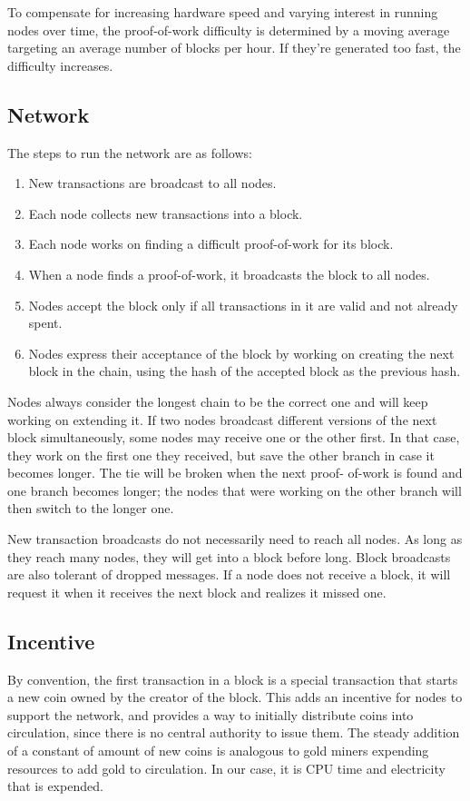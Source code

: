\documentclass[11pt]{article}
\begin{document}
To compensate for increasing hardware speed and varying interest in running nodes over time, the proof-of-work difficulty is determined by a moving average targeting an average number of blocks per hour.
If they're generated too fast, the difficulty increases.

\subsection{Network}
\label{sec:orga9cfa59}
The steps to run the network are as follows:

\begin{enumerate}
\item New transactions are broadcast to all nodes.
\item Each node collects new transactions into a block.
\item Each node works on finding a difficult proof-of-work for its block.
\item When a node finds a proof-of-work, it broadcasts the block to all nodes.
\item Nodes accept the block only if all transactions in it are valid and not already spent.
\item Nodes express their acceptance of the block by working on creating the next block in the chain, using the hash of the accepted block as the previous hash.
\end{enumerate}

Nodes always consider the longest chain to be the correct one and will keep working on extending it.
If two nodes broadcast different versions of the next block simultaneously, some nodes may receive one or the other first.
In that case, they work on the first one they received, but save the other branch in case it becomes longer.
The tie will be broken when the next proof- of-work is found and one branch becomes longer; the nodes that were working on the other branch will then switch to the longer one.

New transaction broadcasts do not necessarily need to reach all nodes.
As long as they reach many nodes, they will get into a block before long.
Block broadcasts are also tolerant of dropped messages.
If a node does not receive a block, it will request it when it receives the next block and realizes it missed one.

\subsection{Incentive}
\label{sec:org7edcede}
By convention, the first transaction in a block is a special transaction that starts a new coin owned by the creator of the block.
This adds an incentive for nodes to support the network, and provides a way to initially distribute coins into circulation, since there is no central authority to issue them.
The steady addition of a constant of amount of new coins is analogous to gold miners expending resources to add gold to circulation.
In our case, it is CPU time and electricity that is expended.
\end{document}
